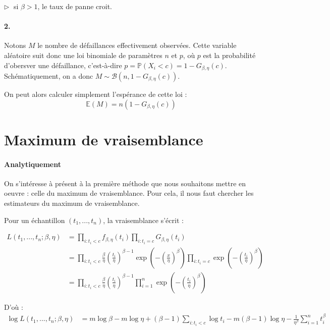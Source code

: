\documentclass[a4paper]{report}
\begin{document}
  $\triangleright \; $ si $\beta>1$, le taux de panne croit.
  
  \subsubsection{2.}
  Notons $M$ le nombre de défaillances effectivement observées. Cette variable aléatoire suit donc une loi binomiale de paramètres $n$ et $p$, où $p$ est la probabilité d'obersver une défaillance, c'est-à-dire $p=\mathbb{P}(X_i<c)=1-G_{\beta,\eta}(c)$. Schématiquement, on a donc $M \sim \mathcal{B}(n,1-G_{\beta,\eta}(c))$.
  
  On peut alors calculer simplement l'espérance de cette loi :
  \[\mathbb{E}(M)=n(1-G_{\beta,\eta}(c))\]
  
  
  \chapter {Maximum de vraisemblance}
  
    \subsubsection{Analytiquement}
    
    On s'intéresse à présent à la première méthode que nous souhaitons mettre en oeuvre : celle du maximum de vraisemblance. Pour cela, il nous faut chercher les estimateurs du maximum de vraisemblance.
    
    Pour un échantillon $(t_1,...,t_n)$, la vraisemblance s'écrit :
    
    \begin{align*}
	L(t_1,...,t_n;\beta,\eta) & = \prod_{i:t_i<c} {f_{\beta,\eta}(t_i)}  \prod_{i:t_i=c} {G_{\beta,\eta}(t_i)} \\
	& =  \prod_{i:t_i<c}{\frac{\beta}{\eta} \left(\frac{t_i}{\eta}\right)^{\beta-1}\exp\left(-\left(\frac{x}{\eta}\right)^{\beta}\right) }  \prod_{i:t_i=c} {\exp\left(-\left(\frac{t_i}{\eta}\right)^{\beta}\right)}\\
	& = \prod_{i:t_i<c}{\frac{\beta}{\eta} \left(\frac{t_i}{\eta}\right)^{\beta-1} }  \prod_{i=1}^{n} {\exp\left(-\left(\frac{t_i}{\eta}\right)^{\beta}\right)}
	\end{align*}
	
	D'où :
	\begin{align*}
	\log L(t_1,...,t_n;\beta,\eta) & = m \log \beta - m\log \eta + (\beta-1)\sum_{i:t_i<c}{\log t_i} - m(\beta-1)\log \eta - \frac{1}{\eta^\beta} \sum_{i=1}^{n} {t_i^\beta}
     \end{align*}
     
\end{document}
